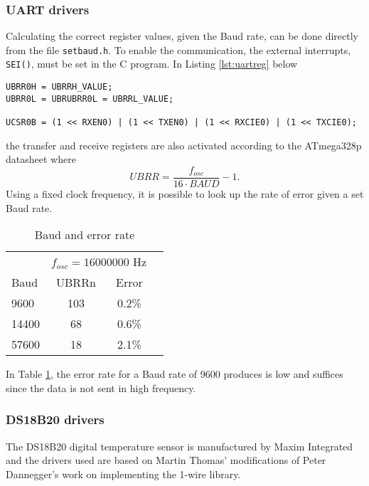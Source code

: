 \subsubsection{UART drivers}%
\label{ssub:uart_drivers}
Calculating the correct register values, given the Baud rate, can be done directly from the file \verb|setbaud.h|. To enable the communication, the external interrupts, \verb|SEI()|, must be set in the C program. In Listing \ref{lst:uartreg} below
\begin{lstlisting}[caption={Enabling UART on the ATmega328p}, label={lst:uartreg}]
UBRR0H = UBRRH_VALUE;
UBRR0L = UBRUBRR0L = UBRRL_VALUE;

UCSR0B = (1 << RXEN0) | (1 << TXEN0) | (1 << RXCIE0) | (1 << TXCIE0);
\end{lstlisting}
the transfer and receive registers are also activated according to the ATmega328p datasheet \cite{atmega328p} where  
\begin{equation}
  UBRR = \frac{f_{osc}}{16\cdot BAUD} -1.
\end{equation}
Using a fixed clock frequency, it is possible to look up the rate of error given a set Baud rate. 
\begin{table}[h]
  \centering
  \caption{Baud and error rate}
  \label{tab:bauderr}
  \begin{tabular}{lccl}\toprule
  & \multicolumn{2}{c}{$f_{osc} = 16000000$ Hz}
  \\\cmidrule(lr){2-3}
  Baud & UBRRn  & Error \\\midrule
  9600 & 103 & 0.2\% \\
  14400 & 68 & 0.6\% \\
  57600 & 18 & 2.1\% \\\bottomrule
  \end{tabular}
\end{table}

In Table \ref{tab:bauderr}, the error rate for a Baud rate of 9600 produces is low and suffices since the data is not sent in high frequency. 

\subsubsection{DS18B20 drivers}%
\label{ssub:ds18b20_drivers}
The DS18B20 digital temperature sensor is manufactured by Maxim Integrated and the drivers used are based on Martin Thomas' modifications of Peter Dannegger's work on implementing the 1-wire library. 


